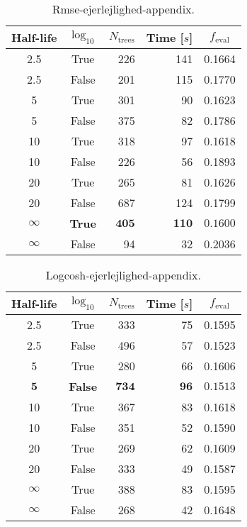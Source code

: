 


 \begin{table}[h!]
  \begin{tabular}{@{}ccrrc@{}}
    Half-life & $\log_{10}$ & $N_\mathrm{trees}$ & Time [$s$] & $f_\mathrm{eval}$ \\
    \midrule
    \num{2.5} & True & \num{226} & \num{141} & \num{0.1664} \\
    \num{2.5} & False & \num{201} & \num{115} & \num{0.1770} \\
    \num{5} & True & \num{301} & \num{90} & \num{0.1623} \\
    \num{5} & False & \num{375} & \num{82} & \num{0.1786} \\
    \num{10} & True & \num{318} & \num{97} & \num{0.1618} \\
    \num{10} & False & \num{226} & \num{56} & \num{0.1893} \\
    \num{20} & True & \num{265} & \num{81} & \num{0.1626} \\
    \num{20} & False & \num{687} & \num{124} & \num{0.1799} \\
    $\bm{\infty}$ & \textbf{True} & $\mathbf{405}$ & $\mathbf{110}$ & $\mathbf{0.1600}$ \\
    $\infty$ & False & \num{94} & \num{32} & \num{0.2036} \\
  \end{tabular}
  \caption{\label{tab:h:HPO_initial_Rmse-ejerlejlighed-appendix}Rmse-ejerlejlighed-appendix.}
\end{table}


\begin{table}[h!]
  \begin{tabular}{@{}ccrrc@{}}
    Half-life & $\log_{10}$ & $N_\mathrm{trees}$ & Time [$s$] & $f_\mathrm{eval}$ \\
    \midrule
    \num{2.5} & True & \num{333} & \num{75} & \num{0.1595} \\
    \num{2.5} & False & \num{496} & \num{57} & \num{0.1523} \\
    \num{5} & True & \num{280} & \num{66} & \num{0.1606} \\
    $\mathbf{5}$ & \textbf{False} & $\mathbf{734}$ & $\mathbf{96}$ & $\mathbf{0.1513}$ \\
    \num{10} & True & \num{367} & \num{83} & \num{0.1618} \\
    \num{10} & False & \num{351} & \num{52} & \num{0.1590} \\
    \num{20} & True & \num{269} & \num{62} & \num{0.1609} \\
    \num{20} & False & \num{333} & \num{49} & \num{0.1587} \\
    $\infty$ & True & \num{388} & \num{83} & \num{0.1595} \\
    $\infty$ & False & \num{268} & \num{42} & \num{0.1648} \\
  \end{tabular}
  \caption{\label{tab:h:HPO_initial_Logcosh-ejerlejlighed-appendix}Logcosh-ejerlejlighed-appendix.}
\end{table}

